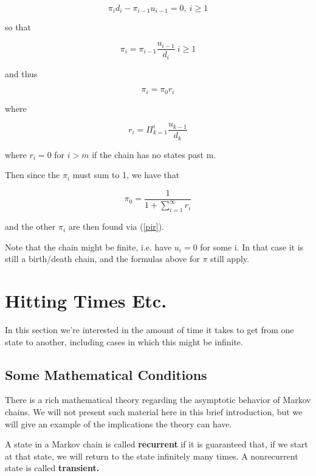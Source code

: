 \begin{equation}
\pi_i d_i - \pi_{i-1} u_{i-1} = 0,
~ i \geq 1
\end{equation}

so that 

\begin{equation}
\pi_i = \pi_{i-1} \frac{u_{i-1}}{d_i}
~ i \geq 1
\end{equation}

and thus

\begin{equation}
\label{pir}
\pi_i = \pi_0 r_i
\end{equation}

where

\begin{equation}
r_{i}=\Pi ^{i}_{k=1}\frac{u_{k-1}}{d_k}
\end{equation}

where $r_i = 0$ for $i > m$ if the chain has no states past m.

Then since the $\pi_i$ must sum to 1, we have that

\begin{equation}
\pi_{0}=\frac{1}{1+\sum ^{\infty }_{i=1}r_{i}}
\end{equation}  

and the other $\pi_i$ are then found via (\ref{pir}).  

Note that the chain might be finite, i.e. have $u_i = 0$ for some i.  In
that case it is still a birth/death chain, and the formulas above for
$\pi$ still apply.

\section{Hitting Times Etc.}
\label{hitting}

In this section we're interested in the amount of time it takes to get
from one state to another, including cases in which this might be
infinite.

\subsection{Some Mathematical Conditions}

There is a rich mathematical theory regarding the asymptotic behavior of
Markov chains. We will not present such material here in this brief
introduction, but we will give an example of the implications the theory
can have.

A state in a Markov chain is called \textbf{recurrent} if it is
guaranteed that, if we start at that state, we will return to the state
infinitely many times.  A nonrecurrent state is called
\textbf{transient.} 

